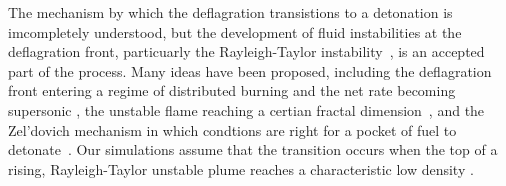 \documentclass[iop,apj]{emulateapj}
\begin{document}
The mechanism by which the deflagration transistions to a detonation
is imcompletely understood, but the development of fluid instabilities
at the deflagration front, particuarly the Rayleigh-Taylor 
instability~\cite{taylor+50,chandra+81}, is an accepted part of the process.
Many ideas have been proposed, including the deflagration front
entering a regime of distributed burning and the net
rate becoming supersonic \cite{NiemWoos97}, the unstable
flame reaching a certian fractal dimension~\cite{woosley90},
and the Zel'dovich mechanism in which condtions are right for
a pocket of fuel to 
detonate~\cite{zeldovichetal1970,KhokOranWhee97,jacketal2014}.
Our simulations assume that the transition occurs when the top of a 
rising, Rayleigh-Taylor unstable plume reaches a characteristic low
density \cite{townsley.calder.ea:flame}.

%
%
%
%
%
%
%
%
%
\end{document}
